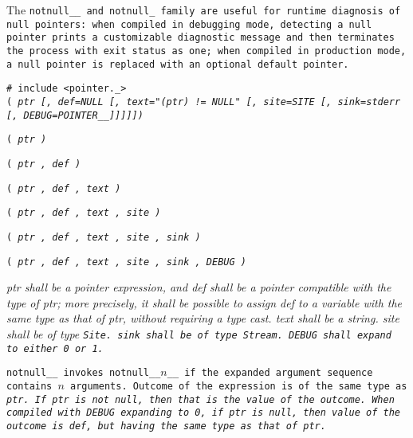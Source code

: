 The \tt{notnull__} and \tt{notnull_} family are
useful for runtime diagnosis of null pointers:
when compiled in debugging mode, detecting a null pointer prints a customizable
diagnostic message and then terminates the process with exit status as one;
when compiled in production mode,
a null pointer is replaced with an optional default pointer.


\tt{# include <pointer._>}\\

 \tt{(} \it{ptr}
[\tt{,} \it{def}\tt {=NULL}
[\tt{,} \it{text}\tt{="(}\it{ptr}\tt{) != NULL"}
[\tt{,} \it{site}\tt{=SITE}
[\tt{,} \it{sink}\tt{=stderr}
[\tt{,} \it{DEBUG}\tt{=POINTER__}]]]]]\tt{)}

 \tt{(}
\it{ptr}   \tt{)}

 \tt{(}
\it{ptr}   \tt{,}
\it{def}   \tt{)}

 \tt{(}
\it{ptr}   \tt{,}
\it{def}   \tt{,}
\it{text}  \tt{)}

 \tt{(}
\it{ptr}   \tt{,}
\it{def}   \tt{,}
\it{text}  \tt{,}
\it{site}  \tt{)}

 \tt{(}
\it{ptr}   \tt{,}
\it{def}   \tt{,}
\it{text}  \tt{,}
\it{site}  \tt{,}
\it{sink}  \tt{)}

 \tt{(}
\it{ptr}   \tt{,}
\it{def}   \tt{,}
\it{text}  \tt{,}
\it{site}  \tt{,}
\it{sink}  \tt{,}
\it{DEBUG} \tt{)}\\


\it{ptr} shall be a pointer expression, and \it{def}
shall be a pointer compatible with the type of \it{ptr};
more precisely, it shall be possible to assign \it{def} to a variable
with the same type as that of \it{ptr}, without requiring a type cast.
\it{text} shall be a string.
\it{site} shall be of type \tt{Site}.
\it{sink} shall be of type \tt{Stream}.
\it{DEBUG} shall expand to either \tt{0} or \tt{1}.


\tt{notnull__} invokes \tt{notnull__}$n$\_\_ if the
expanded argument sequence contains  $n$ arguments.
Outcome of the expression is of the same type as \it{ptr}.
If \it{ptr} is not null, then that is the value of the outcome.
When compiled with \it{DEBUG} expanding to \tt{0}, if \it{ptr} is null, then
value of the outcome is \it{def}, but having the same type as that of \it{ptr}.

